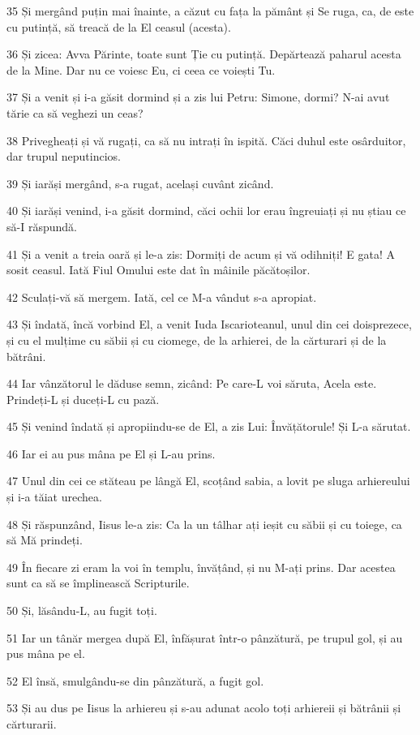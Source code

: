 \par 35 Și mergând puțin mai înainte, a căzut cu fața la pământ și Se ruga, ca, de este cu putință, să treacă de la El ceasul (acesta).
\par 36 Și zicea: Avva Părinte, toate sunt Ție cu putință. Depărtează paharul acesta de la Mine. Dar nu ce voiesc Eu, ci ceea ce voiești Tu.
\par 37 Și a venit și i-a găsit dormind și a zis lui Petru: Simone, dormi? N-ai avut tărie ca să veghezi un ceas?
\par 38 Privegheați și vă rugați, ca să nu intrați în ispită. Căci duhul este osârduitor, dar trupul neputincios.
\par 39 Și iarăși mergând, s-a rugat, același cuvânt zicând.
\par 40 Și iarăși venind, i-a găsit dormind, căci ochii lor erau îngreuiați și nu știau ce să-I răspundă.
\par 41 Și a venit a treia oară și le-a zis: Dormiți de acum și vă odihniți! E gata! A sosit ceasul. Iată Fiul Omului este dat în mâinile păcătoșilor.
\par 42 Sculați-vă să mergem. Iată, cel ce M-a vândut s-a apropiat.
\par 43 Și îndată, încă vorbind El, a venit Iuda Iscarioteanul, unul din cei doisprezece, și cu el mulțime cu săbii și cu ciomege, de la arhierei, de la cărturari și de la bătrâni.
\par 44 Iar vânzătorul le dăduse semn, zicând: Pe care-L voi săruta, Acela este. Prindeți-L și duceți-L cu pază.
\par 45 Și venind îndată și apropiindu-se de El, a zis Lui: Învățătorule! Și L-a sărutat.
\par 46 Iar ei au pus mâna pe El și L-au prins.
\par 47 Unul din cei ce stăteau pe lângă El, scoțând sabia, a lovit pe sluga arhiereului și i-a tăiat urechea.
\par 48 Și răspunzând, Iisus le-a zis: Ca la un tâlhar ați ieșit cu săbii și cu toiege, ca să Mă prindeți.
\par 49 În fiecare zi eram la voi în templu, învățând, și nu M-ați prins. Dar acestea sunt ca să se împlinească Scripturile.
\par 50 Și, lăsându-L, au fugit toți.
\par 51 Iar un tânăr mergea după El, înfășurat într-o pânzătură, pe trupul gol, și au pus mâna pe el.
\par 52 El însă, smulgându-se din pânzătură, a fugit gol.
\par 53 Și au dus pe Iisus la arhiereu și s-au adunat acolo toți arhiereii și bătrânii și cărturarii.
